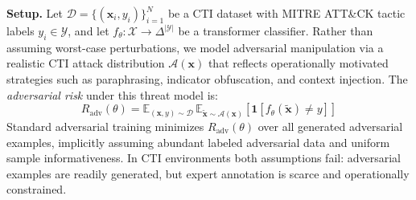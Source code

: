 \documentclass[review,1p,times,number]{elsarticle}
\begin{document}
\textbf{Setup.} Let $\mathcal{D} = \{(\mathbf{x}_i, y_i)\}_{i=1}^{N}$
be a CTI dataset with MITRE ATT\&CK tactic labels $y_i \in \mathcal{Y}$,
and let $f_\theta : \mathcal{X} \to \Delta^{|\mathcal{Y}|}$ be a
transformer classifier. Rather than assuming worst-case perturbations,
we model adversarial manipulation via a realistic CTI attack
distribution $\mathcal{A}(\mathbf{x})$ that reflects operationally
motivated strategies such as paraphrasing, indicator obfuscation, and
context injection. The \textit{adversarial risk} under this threat
model is:
\begin{equation}
R_{\mathrm{adv}}(\theta) =
\mathbb{E}_{(\mathbf{x},y)\sim\mathcal{D}}\,
\mathbb{E}_{\tilde{\mathbf{x}}\sim\mathcal{A}(\mathbf{x})}
\!\left[\mathbf{1}\!\left[f_\theta(\tilde{\mathbf{x}}) \neq y\right]\right]
\label{eq:adv_risk}
\end{equation}
Standard adversarial training minimizes $R_{\mathrm{adv}}(\theta)$
over all generated adversarial examples, implicitly assuming abundant
labeled adversarial data and uniform sample informativeness. In CTI
environments both assumptions fail: adversarial examples are readily
generated, but expert annotation is scarce and operationally
constrained.
\end{document}
